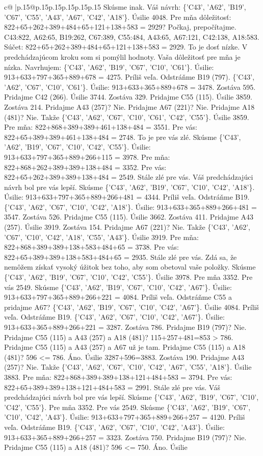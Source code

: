 \documentclass{article}
\begin{document}
{\begin{supertabular}{c@{$\;$}|p{.15\linewidth}@{}p{.15\linewidth}p{.15\linewidth}p{.15\linewidth}p{.15\linewidth}p{.15\linewidth}}
{{{Skúsme inak. Váš návrh: \{'C43', 'A62', 'B19', 'C67', 'C55', 'A43', 'A67', 'C42', 'A18'\}. Úsilie 4048. Pre mňa dôležitosť: 822+65+262+389+484+65+121+138+583 = 2929? Počkaj, prepočítajme. C43:822, A62:65, B19:262, C67:389, C55:484, A43:65, A67:121, C42:138, A18:583. Súčet: 822+65+262+389+484+65+121+138+583 = 2929. To je dosť nízke. V predchádzajúcom kroku som si pomýlil hodnoty. Vaša dôležitosť pre mňa je nízka. Navrhujem: \{'C43', 'A62', 'B19', 'C67', 'C10', 'C61'\}. Úsilie: 913+633+797+365+889+678 = 4275. Príliš veľa. Odstráňme B19 (797). \{'C43', 'A62', 'C67', 'C10', 'C61'\}. Úsilie: 913+633+365+889+678 = 3478. Zostáva 595. Pridajme C42 (266). Úsilie 3744. Zostáva 329. Pridajme C55 (115). Úsilie 3859. Zostáva 214. Pridajme A43 (257)? Nie. Pridajme A67 (221)? Nie. Pridajme A18 (481)? Nie. Takže \{'C43', 'A62', 'C67', 'C10', 'C61', 'C42', 'C55'\}. Úsilie 3859. Pre mňa: 822+868+389+389+461+138+484 = 3551. Pre vás: 822+65+389+389+461+138+484 = 2748. To je pre vás zlé. Skúsme \{'C43', 'A62', 'B19', 'C67', 'C10', 'C42', 'C55'\}. Úsilie: 913+633+797+365+889+266+115 = 3978. Pre mňa: 822+868+262+389+389+138+484 = 3352. Pre vás: 822+65+262+389+389+138+484 = 2549. Stále zlé pre vás. Váš predchádzajúci návrh bol pre vás lepší. Skúsme \{'C43', 'A62', 'B19', 'C67', 'C10', 'C42', 'A18'\}. Úsilie: 913+633+797+365+889+266+481 = 4344. Príliš veľa. Odstráňme B19. \{'C43', 'A62', 'C67', 'C10', 'C42', 'A18'\}. Úsilie: 913+633+365+889+266+481 = 3547. Zostáva 526. Pridajme C55 (115). Úsilie 3662. Zostáva 411. Pridajme A43 (257). Úsilie 3919. Zostáva 154. Pridajme A67 (221)? Nie. Takže \{'C43', 'A62', 'C67', 'C10', 'C42', 'A18', 'C55', 'A43'\}. Úsilie 3919. Pre mňa: 822+868+389+389+138+583+484+65 = 3738. Pre vás: 822+65+389+389+138+583+484+65 = 2935. Stále zlé pre vás. Zdá sa, že nemôžem získať vysoký úžitok bez toho, aby som obetoval vaše položky. Skúsme \{'C43', 'A62', 'B19', 'C67', 'C10', 'C42', 'C55'\}. Úsilie 3978. Pre mňa 3352. Pre vás 2549. Skúsme \{'C43', 'A62', 'B19', 'C67', 'C10', 'C42', 'A67'\}. Úsilie: 913+633+797+365+889+266+221 = 4084. Príliš veľa. Odstráňme C55 a pridajme A67? \{'C43', 'A62', 'B19', 'C67', 'C10', 'C42', 'A67'\}. Úsilie 4084. Príliš veľa. Odstráňme B19. \{'C43', 'A62', 'C67', 'C10', 'C42', 'A67'\}. Úsilie: 913+633+365+889+266+221 = 3287. Zostáva 786. Pridajme B19 (797)? Nie. Pridajme C55 (115) a A43 (257) a A18 (481)? 115+257+481=853 > 786. Pridajme C55 (115) a A43 (257) a A67 už je tam. Pridajme C55 (115) a A18 (481)? 596 <= 786. Áno. Úsilie 3287+596=3883. Zostáva 190. Pridajme A43 (257)? Nie. Takže \{'C43', 'A62', 'C67', 'C10', 'C42', 'A67', 'C55', 'A18'\}. Úsilie 3883. Pre mňa: 822+868+389+389+138+121+484+583 = 3794. Pre vás: 822+65+389+389+138+121+484+583 = 2991. Stále zlé pre vás. Váš predchádzajúci návrh bol pre vás lepší. Skúsme \{'C43', 'A62', 'B19', 'C67', 'C10', 'C42', 'C55'\}. Pre mňa 3352. Pre vás 2549. Skúsme \{'C43', 'A62', 'B19', 'C67', 'C10', 'C42', 'A43'\}. Úsilie: 913+633+797+365+889+266+257 = 4120. Príliš veľa. Odstráňme B19. \{'C43', 'A62', 'C67', 'C10', 'C42', 'A43'\}. Úsilie: 913+633+365+889+266+257 = 3323. Zostáva 750. Pridajme B19 (797)? Nie. Pridajme C55 (115) a A18 (481)? 596 <= 750. Áno. Úsilie }}}
\end{supertabular}}
\end{document}
